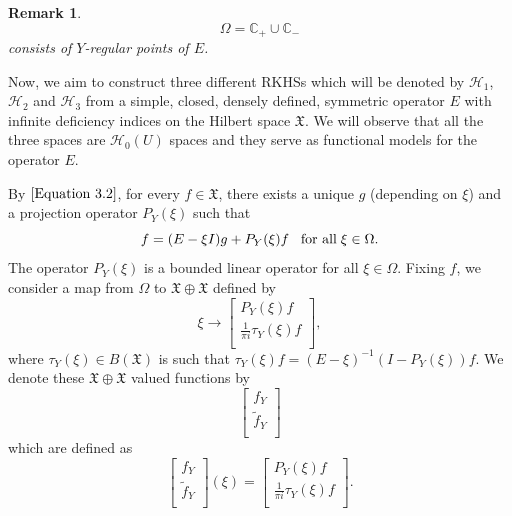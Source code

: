 \documentclass [12pt,reqno]{amsart}
\numberwithin{equation}{subsection}
\newtheorem{rmk}[thm]{Remark}
\numberwithin{equation}{section}
\begin{document}
\begin{rmk}
\begin{equation}
\Omega= \mathbb{C}_+ \cup \mathbb{C_-} 
\end{equation}
consists of $Y$-regular points of $E$.
\end{rmk}



Now, we aim to construct three different RKHSs which will be denoted by $\mathcal{H}_1$, $\mathcal{H}_2$ and $\mathcal{H}_3$ from a simple, closed, densely defined, symmetric operator $E$ with infinite deficiency indices on the Hilbert space $\mathfrak{X}$. We will observe that all the three spaces are $\mathcal{H}_0(U)$ spaces and they serve as functional models for the operator $E$.

By $\eqref{Equation 3.2}$, for every $f \in \mathfrak{X}$, there exists a unique $g$ (depending on $\xi$) and a projection operator $P_{Y}(\xi)$ such that\begin{equation}
f=(E- \xi I)g + P_{Y}(\xi) f  \hspace{0.3cm} \text{for all} \hspace{0.1cm} \xi \in \Omega.
\end{equation}
The operator $P_{Y}(\xi)$ is a bounded linear operator for all $\xi \in \Omega$. Fixing $f$, we consider a map from $\Omega $ to $\mathfrak{X}\oplus \mathfrak{X}$ defined by \begin{equation}
 \xi \longrightarrow \begin{bmatrix} 
	P_{Y}(\xi)f  \\
	\frac{1}{\pi i} \tau_{Y}(\xi)f \\
	\end{bmatrix},
\end{equation}
where $\tau_{Y}(\xi)\in B(\mathfrak{X})$ is such that $\tau_{Y}(\xi)f=(E-\xi)^{-1}(I-P_{Y} (\xi))f$. We denote these $\mathfrak{X} \oplus \mathfrak{X}$ valued functions by $$\begin{bmatrix} 
	f_Y  \\
	\tilde{f}_Y \\
	\end{bmatrix}
	 $$
which are defined as \begin{equation}
\begin{bmatrix} 
	f_Y  \\
	\tilde{f}_Y \\
	\end{bmatrix}
	(\xi)=\begin{bmatrix} 
	P_{Y}(\xi)f  \\
	\frac{1}{\pi i} \tau_{Y}(\xi)f \\
	\end{bmatrix}.
\end{equation}
\end{document}
